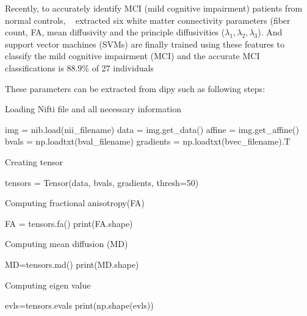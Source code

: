 Recently,  to accurately identify MCI (mild cognitive impairment) patients from normal controls, ~\cite{wee2011enriched} extracted six white matter connectivity parameters (fiber count, FA, mean diffusivity and the principle diffusivities ($\lambda_{1},\lambda_{2},\lambda_{3}$). And support vector machines (SVMs) are finally trained using these features to classify the mild cognitive impairment (MCI) and the accurate MCI classifications is $88.9\%$ of 27 individuals



These parameters can be extracted from dipy such as following steps:

Loading Nifti file and all necessary information

\begin{python}
img = nib.load(nii_filename)
data = img.get_data()
affine = img.get_affine()
bvals = np.loadtxt(bval_filename)
gradients = np.loadtxt(bvec_filename).T 
\end{python}

Creating tensor
\begin{python}
        tensors = Tensor(data, bvals, gradients, thresh=50)
\end{python}

Computing fractional anisotropy(FA)
\begin{python}
        FA = tensors.fa()
        print(FA.shape)
\end{python}

Computing mean diffusion (MD)
\begin{python}
        MD=tensors.md() 
        print(MD.shape)
\end{python} 

Computing eigen value
\begin{python}
        evls=tensors.evals        
        print(np.shape(evls))
\end{python}      

